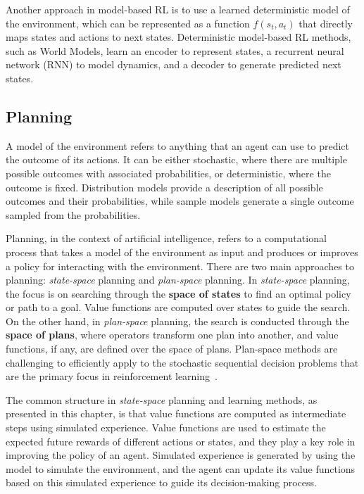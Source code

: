 \documentclass[../xlapes02]{subfiles}
\begin{document}
    Another approach in model-based RL is to use a learned deterministic model of the environment, which can be represented as a function $f(s_t, a_t)$ that directly maps states and actions to next states. Deterministic model-based RL methods, such as World Models, learn an encoder to represent states, a recurrent neural network (RNN) to model dynamics, and a decoder to generate predicted next states.

    \subsection{Planning}\label{subsec:planning}
    A model of the environment refers to anything that an agent can use to predict the outcome of its actions. It can be either stochastic, where there are multiple possible outcomes with associated probabilities, or deterministic, where the outcome is fixed. Distribution models provide a description of all possible outcomes and their probabilities, while sample models generate a single outcome sampled from the probabilities.

    Planning, in the context of artificial intelligence, refers to a computational process that takes a model of the environment as input and produces or improves a policy for interacting with the environment. There are two main approaches to planning: \emph{state-space} planning and \emph{plan-space} planning. In \emph{state-space} planning, the focus is on searching through the \textbf{space of states} to find an optimal policy or path to a goal. Value functions are computed over states to guide the search. On the other hand, in \emph{plan-space} planning, the search is conducted through the \textbf{space of plans}, where operators transform one plan into another, and value functions, if any, are defined over the space of plans. Plan-space methods are challenging to efficiently apply to the stochastic sequential decision problems that are the primary focus in reinforcement learning~\cite{sutton2018reinforcement}.

    The common structure in \emph{state-space} planning and learning methods, as presented in this chapter, is that value functions are computed as intermediate steps using simulated experience. Value functions are used to estimate the expected future rewards of different actions or states, and they play a key role in improving the policy of an agent. Simulated experience is generated by using the model to simulate the environment, and the agent can update its value functions based on this simulated experience to guide its decision-making process.
\end{document}
